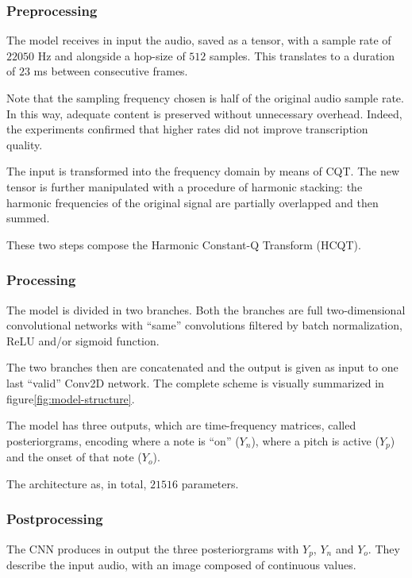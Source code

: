 \documentclass[10pt,twocolumn,letterpaper]{article}
\begin{document}
\subsubsection{Preprocessing}

The model receives in input the audio, saved as a tensor, with a sample rate of $\num{22050}$ Hz and alongside a hop-size of $512$ samples. This translates to a duration of $23$ ms between consecutive frames.

Note that the sampling frequency chosen is half of the original audio sample rate. In this way, adequate content is preserved without unnecessary overhead. Indeed, the experiments confirmed that higher rates did not improve transcription quality.

The input is transformed into the frequency domain by means of CQT. The new tensor is further manipulated with a procedure of harmonic stacking: the harmonic frequencies of the original signal are partially overlapped and then summed.

These two steps compose the Harmonic Constant-Q Transform (HCQT).

\subsubsection{Processing}

The model is divided in two branches. Both the branches are full two-dimensional convolutional networks with ``same'' convolutions filtered by batch normalization, ReLU and/or sigmoid function.

The two branches then are concatenated and the output is given as input to one last ``valid'' Conv2D network. The complete scheme is visually summarized in figure\;\ref{fig:model-structure}.

The model has three outputs, which are time-frequency matrices, called posteriorgrams, encoding where a note is ``on'' ($Y_n$), where a pitch is active ($Y_p$) and the onset of that note ($Y_o$).

The architecture as, in total, $\num{21516}$ parameters.

\subsubsection{Postprocessing}

The CNN produces in output the three posteriorgrams with $Y_p$, $Y_n$ and $Y_o$. They describe the input audio, with an image composed of continuous values.
\end{document}
